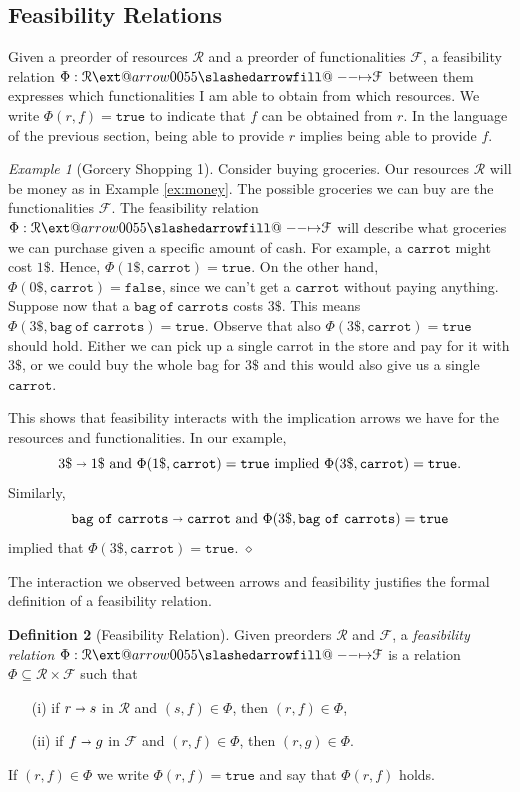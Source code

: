 \documentclass[12pt]{article}
\makeatletter
\theoremstyle{definition}
\newtheorem{definition}{Definition}[section]
\theoremstyle{plain}
\theoremstyle{plain}
\theoremstyle{plain}
\theoremstyle{plain}
\theoremstyle{remark}
\newtheorem{example}[definition]{Example}
\newcommand\xqed[1]{%
	\leavevmode\unskip\penalty9999 \hbox{}\nobreak\hfill
	\quad\hbox{#1}}
\newcommand\exampleend{\xqed{$\diamond$}}
\theoremstyle{remark}
\newcommand{\mc}[1]{\mathcal{#1}}
\newcommand{\sub}{\subseteq}
\newcommand{\true}{\mathtt{true}}
\def\slashedarrowfill@#1#2#3#4#5{%
	$\m@th\thickmuskip0mu\medmuskip\thickmuskip\thinmuskip\thickmuskip
	\relax#5#1\mkern-7mu%
	\cleaders\hbox{$#5\mkern-2mu#2\mkern-2mu$}\hfill
	\mathclap{#3}\mathclap{#2}%
	\cleaders\hbox{$#5\mkern-2mu#2\mkern-2mu$}\hfill
	\mkern-7mu#4$%
}
\def\rightslashedarrowfill@{%
	\slashedarrowfill@\relbar\relbar\mapstochar\rightarrow}
\newcommand\xslashedrightarrow[2][]{%
	\ext@arrow 0055{\rightslashedarrowfill@}{#1}{#2}}
\makeatother
\begin{document}
\subsection{Feasibility Relations}
Given a preorder of resources $\mc{R}$ and a preorder of functionalities $\mc{F}$, a feasibility relation $\Phi: \mc{R} \xslashedrightarrow{} \mc{F}$ between them expresses which functionalities I am able to obtain from which resources. We write $\Phi(r,f) = \mathtt{true}$ to indicate that $f$ can be obtained from $r$. In the language of the previous section, being able to provide $r$ implies being able to provide $f$.

\begin{example}[Gorcery Shopping 1]\label{ex:groceries}
	Consider buying groceries. Our resources $\mc{R}$ will be money as in Example \ref{ex:money}. The possible groceries we can buy are the functionalities $\mc{F}$. The feasibility relation $\Phi: \mc{R} \xslashedrightarrow{} \mc{F}$ will describe what groceries we can purchase given a specific amount of cash. For example, a $\mathtt{carrot}$ might cost $1\$$. Hence, $\Phi(1\$,\mathtt{carrot}) = \mathtt{true}$. On the other hand, $\Phi(0\$, \mathtt{carrot}) = \mathtt{false}$, since we can't get a $\mathtt{carrot}$ without paying anything. Suppose now that a $\mathtt{bag\ of\ carrots}$ costs $3\$$. This means $\Phi(3\$,\mathtt{bag\ of\ carrots}) = \mathtt{true}$. Observe that also $\Phi(3\$,\mathtt{carrot}) = \true$ should hold. Either we can pick up a single carrot in the store and pay for it with $3\$$, or we could buy the whole bag for $3\$$ and this would also give us a single $\mathtt{carrot}$. 
	
	This shows that feasibility interacts with the implication arrows we have for the resources and functionalities. In our example,
	$$3\$ \shortrightarrow 1\$ \text{ and } \Phi(1\$, \mathtt{carrot}) = \true  \text{ implied } \Phi(3\$, \mathtt{carrot}) = \true.$$ 
	Similarly, 
	$$\mathtt{bag\ of\ carrots} \shortrightarrow \mathtt{carrot}  \text{ and } \Phi(3\$,\mathtt{bag\ of\ carrots}) = \mathtt{true} $$ 
	implied that $\Phi(3\$,\mathtt{carrot}) = \true.$ \exampleend
\end{example}

The interaction we observed between arrows and feasibility justifies the formal definition of a feasibility relation.

\begin{definition}[Feasibility Relation]\label{def:feasibility}
	Given preorders $\mc{R}$ and $\mc{F}$, a \emph{feasibility relation} $\Phi: \mc{R} \xslashedrightarrow{} \mc{F}$ is a relation $\Phi \sub \mc{R} \times \mc{F}$ such that
	\begin{itemize}
		\item[(i)] if $r \shortrightarrow s$ in $\mc{R}$ and $(s,f) \in \Phi$, then $(r,f) \in \Phi$,
		\item[(ii)] if $f \shortrightarrow g$ in $\mc{F}$ and $(r,f) \in \Phi$, then $(r,g) \in \Phi$.
	\end{itemize}
	If $(r,f) \in \Phi$ we write $\Phi(r,f) = \true$ and say that $\Phi(r,f)$ holds.
\end{definition}
\end{document}

